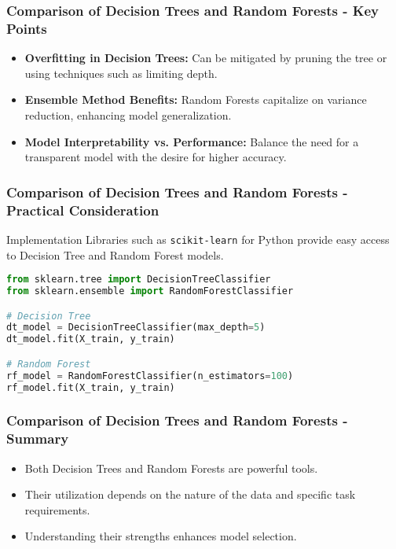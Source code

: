 \documentclass[aspectratio=169]{beamer}
\begin{document}
\begin{frame}
    \frametitle{Comparison of Decision Trees and Random Forests - Key Points}
    \begin{itemize}
        \item \textbf{Overfitting in Decision Trees:} Can be mitigated by pruning the tree or using techniques such as limiting depth.
        \item \textbf{Ensemble Method Benefits:} Random Forests capitalize on variance reduction, enhancing model generalization.
        \item \textbf{Model Interpretability vs. Performance:} Balance the need for a transparent model with the desire for higher accuracy.
    \end{itemize}
\end{frame}

\begin{frame}[fragile]
    \frametitle{Comparison of Decision Trees and Random Forests - Practical Consideration}
    \begin{block}{Implementation}
        Libraries such as \texttt{scikit-learn} for Python provide easy access to Decision Tree and Random Forest models.
    \end{block}
    
    \begin{lstlisting}[language=Python]
from sklearn.tree import DecisionTreeClassifier
from sklearn.ensemble import RandomForestClassifier

# Decision Tree
dt_model = DecisionTreeClassifier(max_depth=5)
dt_model.fit(X_train, y_train)

# Random Forest
rf_model = RandomForestClassifier(n_estimators=100)
rf_model.fit(X_train, y_train)
    \end{lstlisting}
\end{frame}

\begin{frame}
    \frametitle{Comparison of Decision Trees and Random Forests - Summary}
    \begin{itemize}
        \item Both Decision Trees and Random Forests are powerful tools.
        \item Their utilization depends on the nature of the data and specific task requirements.
        \item Understanding their strengths enhances model selection.
    \end{itemize}
\end{frame}
\end{document}
